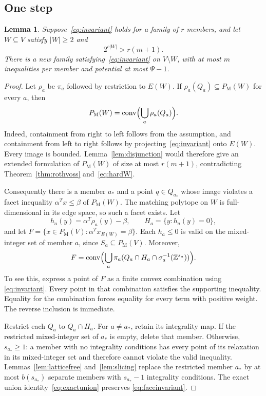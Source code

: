\documentclass[11pt]{article}
\newtheorem{lemma}[theorem]{Lemma}
\theoremstyle{definition}
\DeclareMathOperator{\conv}{conv}
\newcommand{\Z}{\mathbb Z}
\newcommand{\PM}{P_{\mathrm M}}
\begin{document}
\subsection{One step}

\begin{lemma}\label{lem:step}
Suppose~\eqref{eq:invariant} holds for a family of $r$ members, and let
$W\subseteq V$ satisfy $|W|\geq2$ and
\begin{equation}\label{eq:hardW}
 2^{c|W|}>r(m+1).
\end{equation}
There is a new family satisfying~\eqref{eq:invariant} on $V\setminus W$,
with at most $m$ inequalities per member and potential at most $\Psi-1$.
\end{lemma}

\begin{proof}
Let $\rho_a$ be $\pi_a$ followed by restriction to $E(W)$. If
$\rho_a(Q_a)\subseteq\PM(W)$ for every $a$, then
\[
 \PM(W)=\conv\Bigl(\bigcup_a\rho_a(Q_a)\Bigr).
\]
Indeed, containment from right to left follows from the assumption, and
containment from left to right follows by projecting~\eqref{eq:invariant}
onto $E(W)$. Every image is bounded. Lemma~\ref{lem:disjunction} would
therefore give an extended formulation of $\PM(W)$ of size at most
$r(m+1)$, contradicting Theorem~\ref{thm:rothvoss}
and~\eqref{eq:hardW}.

Consequently there is a member $a_*$ and a point $q\in Q_{a_*}$ whose
image violates a facet inequality $\alpha^Tx\leq\beta$ of $\PM(W)$.
The matching polytope on $W$ is full-dimensional in its edge space, so such
a facet exists. Let
\[
 h_a(y)=\alpha^T\rho_a(y)-\beta,\qquad H_a=\{y:h_a(y)=0\},
\]
and let
$F=\{x\in\PM(V):\alpha^Tx_{E(W)}=\beta\}$.
Each $h_a\leq0$ is valid on the mixed-integer set of member $a$, since
$S_a\subseteq\PM(V)$. Moreover,
\begin{equation}\label{eq:faceinvariant}
 F=\conv\Bigl(\bigcup_a
 \pi_a(Q_a\cap H_a\cap\sigma_a^{-1}(\Z^{s_a}))\Bigr).
\end{equation}
To see this, express a point of $F$ as a finite convex combination using
\eqref{eq:invariant}. Every point in that combination satisfies the supporting
inequality. Equality for the combination forces equality for every term
with positive weight. The reverse inclusion is immediate.

Restrict each $Q_a$ to $Q_a\cap H_a$. For $a\ne a_*$, retain its
integrality map. If the restricted mixed-integer set of $a_*$ is empty,
delete that member. Otherwise, $s_{a_*}\geq1$: a member with no integrality
conditions has every point of its relaxation in its mixed-integer set and
therefore cannot violate the valid inequality. Lemmas~\ref{lem:latticefree}
and~\ref{lem:slicing} replace the restricted member $a_*$ by at most
$b(s_{a_*})$ separate members with $s_{a_*}-1$ integrality conditions.
The exact union identity~\eqref{eq:exactunion} preserves
\eqref{eq:faceinvariant}.


\end{proof}
\end{document}

